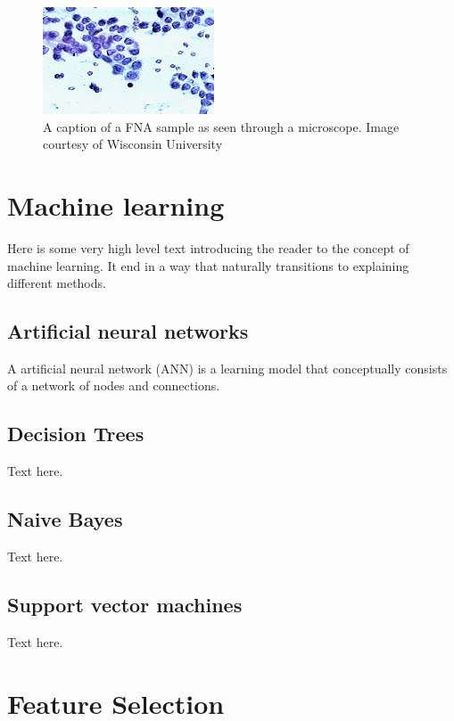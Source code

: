 \begin{figure}[ht!]
  \centering
  \includegraphics[]{images/fna_nuclei.png}
  \caption{A caption of a FNA sample as seen through a microscope. Image courtesy of Wisconsin University}
  \label{fig:fna_nuclei}
\end{figure}



\section{Machine learning}

Here is some very high level text introducing the reader to the concept of machine learning. It end in a way that naturally transitions to explaining different methods.

\subsection{Artificial neural networks}

A artificial neural network (ANN) is a learning model that conceptually consists of a network of nodes and connections. 

\subsection{Decision Trees}

Text here.

\subsection{Naive Bayes}

Text here.

\subsection{Support vector machines}

Text here.

\section{Feature Selection}

